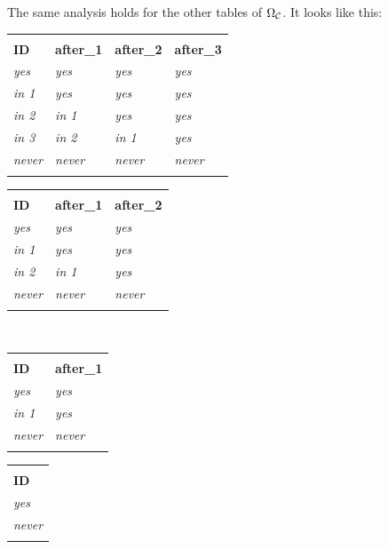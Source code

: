 \documentclass[CT4S-EN-RU]{subfiles}
\begin{document}
\begin{example}
The same analysis holds for the other tables of $\Omega_\mathcal{C}$. It looks like this:
\begin{center}
\begin{tabular}{| l || l | l | l |}
\bhline
\multicolumn{4}{|c|}{$\Omega_\mcC({\tt 0})$}\\\bhline
{\bf ID}&{\bf after\_1}&{\bf after\_2}&{\bf after\_3}\\\bbhline
{\it yes}&{\it yes}&{\it yes}&{\it yes}\\\hline
{\it in 1}&{\it yes}&{\it yes}&{\it yes}\\\hline
{\it in 2}&{\it in 1}&{\it yes}&{\it yes}\\\hline
{\it in 3}&{\it in 2}&{\it in 1}&{\it yes}\\\hline
{\it never}&{\it never}&{\it never}&{\it never}\\\bhline
\end{tabular}
\hsp
\begin{tabular}{| l || l | l |}
\bhline
\multicolumn{3}{|c|}{$\Omega_\mcC({\tt 1})$}\\\bhline
{\bf ID}&{\bf after\_1}&{\bf after\_2}\\\bbhline
{\it yes}&{\it yes}&{\it yes}\\\hline
{\it in 1}&{\it yes}&{\it yes}\\\hline
{\it in 2}&{\it in 1}&{\it yes}\\\hline
{\it never}&{\it never}&{\it never}\\\bhline
\end{tabular}\\\vspace{.2in}
\begin{tabular}{| l || l |}
\bhline
\multicolumn{2}{|c|}{$\Omega_\mcC({\tt 2})$}\\\bhline
{\bf ID}&{\bf after\_1}\\\bbhline
{\it yes}&{\it yes}\\\hline
{\it in 1}&{\it yes}\\\hline
{\it never}&{\it never}\\\bhline
\end{tabular}
\hsp
\begin{tabular}{| l ||}
\bhline
\multicolumn{1}{|c|}{$\Omega_\mcC({\tt 3})$}\\\bhline
{\bf ID}\\\bbhline
{\it yes}\\\hline
{\it never}\\\bhline
\end{tabular}


\end{center}
\end{example}
\end{document}
